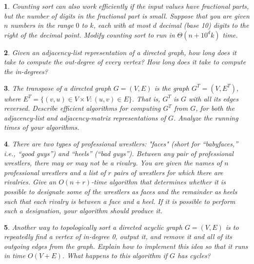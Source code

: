 \documentclass[%
addpoints]{exam}
\theoremstyle{problem}
\newtheorem{p}{}
\begin{document}
\begin{p} 
Counting sort can also work efficiently if the input values have fractional parts, but the number of digits in the fractional part is small. Suppose that you are given \( n \) numbers in the range \( 0 \) to \( k \), each with at most \( d \) decimal (base 10) digits to the right of the decimal point. Modify counting sort to run in \( \Theta(n + 10^d k) \) time.  
\hfill  
\end{p}

\begin{p} 
Given an adjacency-list representation of a directed graph, how long does it take to compute the out-degree of every vertex? How long does it take to compute the in-degrees?  
\hfill  
\end{p}

\begin{p} 
The \textit{transpose} of a directed graph \( G = (V, E) \) is the graph \( G^T = (V, E^T) \), where \( E^T = \{(v, u) \in V \times V : (u, v) \in E\} \). That is, \( G^T \) is \( G \) with all its edges reversed.  
Describe efficient algorithms for computing \( G^T \) from \( G \), for both the adjacency-list and adjacency-matrix representations of \( G \). Analyze the running times of your algorithms.  
\hfill  
\end{p}

\begin{p} 
There are two types of professional wrestlers: "faces" (short for “babyfaces,” i.e., “good guys”) and “heels” (“bad guys”). Between any pair of professional wrestlers, there may or may not be a rivalry. You are given the names of \( n \) professional wrestlers and a list of \( r \) pairs of wrestlers for which there are rivalries. Give an \( O(n + r) \)-time algorithm that determines whether it is possible to designate some of the wrestlers as faces and the remainder as heels such that each rivalry is between a face and a heel. If it is possible to perform such a designation, your algorithm should produce it.  
\hfill  
\end{p}

\begin{p} 
Another way to topologically sort a directed acyclic graph \( G = (V, E) \) is to repeatedly find a vertex of in-degree 0, output it, and remove it and all of its outgoing edges from the graph. Explain how to implement this idea so that it runs in time \( O(V + E) \). What happens to this algorithm if \( G \) has cycles?  
\hfill  
\end{p}
\end{document}
